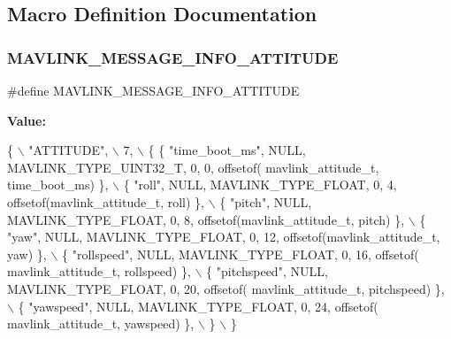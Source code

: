 \subsection{Macro Definition Documentation}
\mbox{\label{mavlink__msg__attitude_8h_a2ceb81e754314e3e0f2e0eb0193c8129}} 
\subsubsection{M\+A\+V\+L\+I\+N\+K\+\_\+\+M\+E\+S\+S\+A\+G\+E\+\_\+\+I\+N\+F\+O\+\_\+\+A\+T\+T\+I\+T\+U\+DE}
{\footnotesize\ttfamily \#define M\+A\+V\+L\+I\+N\+K\+\_\+\+M\+E\+S\+S\+A\+G\+E\+\_\+\+I\+N\+F\+O\+\_\+\+A\+T\+T\+I\+T\+U\+DE}

{\bfseries Value\+:}
\begin{DoxyCode}
\{ \(\backslash\)
    \textcolor{stringliteral}{"ATTITUDE"}, \(\backslash\)
    7, \(\backslash\)
    \{  \{ \textcolor{stringliteral}{"time\_boot\_ms"}, NULL, MAVLINK_TYPE_UINT32_T, 0, 0, offsetof(
      mavlink_attitude_t, time\_boot\_ms) \}, \(\backslash\)
         \{ \textcolor{stringliteral}{"roll"}, NULL, MAVLINK_TYPE_FLOAT, 0, 4, offsetof(mavlink_attitude_t, roll) \}, \(\backslash\)
         \{ \textcolor{stringliteral}{"pitch"}, NULL, MAVLINK_TYPE_FLOAT, 0, 8, offsetof(mavlink_attitude_t, pitch) \}, \(\backslash\)
         \{ \textcolor{stringliteral}{"yaw"}, NULL, MAVLINK_TYPE_FLOAT, 0, 12, offsetof(mavlink_attitude_t, yaw) \}, \(\backslash\)
         \{ \textcolor{stringliteral}{"rollspeed"}, NULL, MAVLINK_TYPE_FLOAT, 0, 16, offsetof(
      mavlink_attitude_t, rollspeed) \}, \(\backslash\)
         \{ \textcolor{stringliteral}{"pitchspeed"}, NULL, MAVLINK_TYPE_FLOAT, 0, 20, offsetof(
      mavlink_attitude_t, pitchspeed) \}, \(\backslash\)
         \{ \textcolor{stringliteral}{"yawspeed"}, NULL, MAVLINK_TYPE_FLOAT, 0, 24, offsetof(
      mavlink_attitude_t, yawspeed) \}, \(\backslash\)
         \} \(\backslash\)
\}
\end{DoxyCode}
\mbox{\label{mavlink__msg__attitude_8h_a9f194be827cde09a9594acc8deda8481}} 
